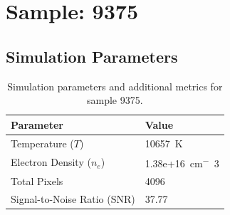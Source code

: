 \documentclass[a4paper,11pt]{article}
\begin{document}
\clearpage

\section{Sample: 9375}
\subsection{Simulation Parameters}
\begin{table}[h!]
    \centering
    \begin{tabular}{ll}
        \toprule
        \textbf{Parameter} & \textbf{Value} \\
        \midrule
        Temperature ($T$) & 10657 \,\si{K} \\
        Electron Density ($n_e$) & 1.38e+16 \,\si{cm^-3} \\
        Total Pixels & 4096 \\
        Signal-to-Noise Ratio (SNR) & 37.77 \\
        \bottomrule
    \end{tabular}
    \caption{Simulation parameters and additional metrics for sample 9375.}
    \label{tab:params_9375}
\end{table}
\end{document}
